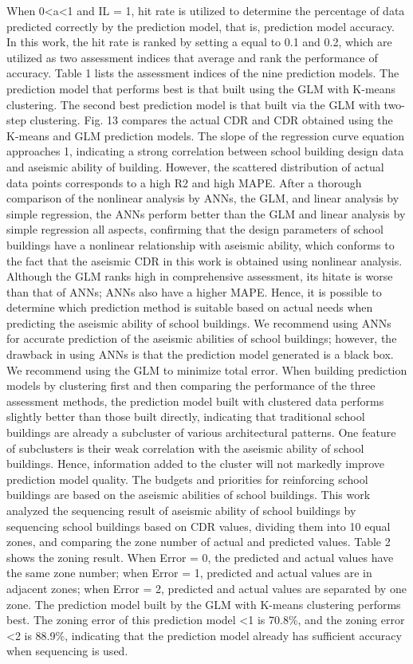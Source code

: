 When 0<a<1 and I{L} = 1, hit rate is utilized to determine the percentage of data predicted correctly by the prediction model, that is, prediction model accuracy. In this work, the hit rate is ranked by setting a equal to 0.1 and 0.2, which are utilized as two assessment indices that average and rank the performance of accuracy. Table 1 lists the assessment indices of the nine prediction models. The prediction model that performs best is that built using the GLM with K-means clustering. The second best prediction model is that built via the GLM with two-step clustering. Fig. 13 compares the actual CDR and CDR obtained using the K-means and GLM prediction models. The slope of the regression curve equation approaches 1, indicating a strong correlation between school building design data and aseismic ability of building. However, the scattered distribution of actual data points corresponds to a high R2 and high MAPE. After a thorough comparison of the nonlinear analysis by ANNs, the GLM, and linear analysis by simple regression, the ANNs perform better than the GLM and linear analysis by simple regression all aspects, confirming that the design parameters of school buildings have a nonlinear relationship with aseismic ability, which conforms to the fact that the aseismic CDR in this work is obtained using nonlinear analysis. Although the GLM ranks high in comprehensive assessment, its hitate is worse than that of ANNs; ANNs also have a higher MAPE. Hence, it is possible to determine which prediction method is suitable based on actual needs when predicting the aseismic ability of school buildings. We recommend using ANNs for accurate prediction of the aseismic abilities of school buildings; however, the drawback in using ANNs is that the prediction model generated is a black box. We recommend using the GLM to minimize total error. When building prediction models by clustering first and then comparing the performance of the three assessment methods, the prediction model built with clustered data performs slightly better than those built directly, indicating that traditional school buildings are already a subcluster of various architectural patterns. One feature of subclusters is their weak correlation with the aseismic ability of school buildings. Hence, information added to the cluster will not markedly improve prediction model quality. The budgets and priorities for reinforcing school buildings are based on the aseismic abilities of school buildings. This work analyzed the sequencing result of aseismic ability of school buildings by sequencing school buildings based on CDR values, dividing them into 10 equal zones, and comparing the zone number of actual and predicted values. Table 2 shows the zoning result. When Error = 0, the predicted and actual values have the same zone number; when Error = 1, predicted and actual values are in adjacent zones; when Error = 2, predicted and actual values are separated by one zone. The prediction model built by the GLM with K-means clustering performs best. The zoning error of this prediction model <1 is 70.8\%, and the zoning error <2 is 88.9\%, indicating that the prediction model already has sufficient accuracy when sequencing is used.


